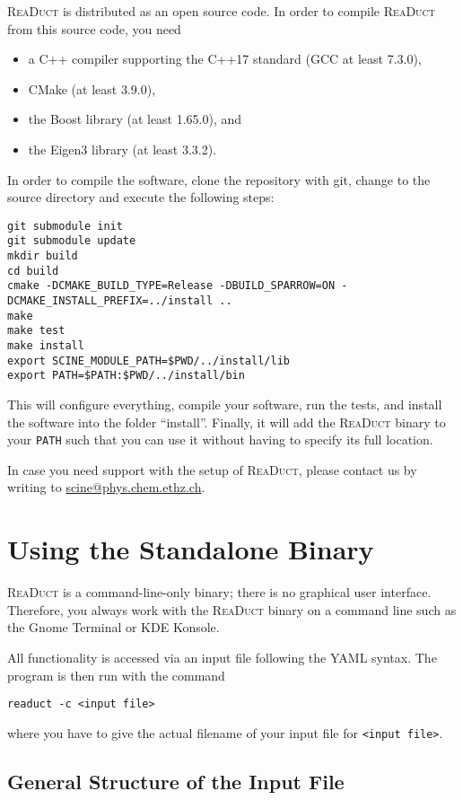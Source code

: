\documentclass[]{tufte-book}
\begin{document}
\textsc{ReaDuct} is distributed as an open source code. In order to compile \textsc{ReaDuct} from this source code, you need
\begin{itemize}
 \item a C++ compiler supporting the C++17 standard (GCC at least 7.3.0),
 \item CMake (at least 3.9.0),
 \item the Boost library (at least 1.65.0), and
 \item the Eigen3 library (at least 3.3.2).
\end{itemize}
In order to compile the software, clone the repository with git, change
to the source directory and execute the following steps:
\begin{verbatim}
git submodule init
git submodule update
mkdir build
cd build
cmake -DCMAKE_BUILD_TYPE=Release -DBUILD_SPARROW=ON -DCMAKE_INSTALL_PREFIX=../install ..
make
make test
make install
export SCINE_MODULE_PATH=$PWD/../install/lib
export PATH=$PATH:$PWD/../install/bin
\end{verbatim}
This will configure everything, compile your software, run the tests, and install the software
into the folder ``install''. Finally, it will add the \textsc{ReaDuct} binary to your \texttt{PATH} such that you can use
it without having to specify its full location.

In case you need support with the setup of \textsc{ReaDuct}, please contact us by writing to \href{scine@phys.chem.ethz.ch}{scine@phys.chem.ethz.ch}.



\chapter{Using the Standalone Binary}

\textsc{ReaDuct} is a command-line-only binary; there is no graphical user interface. Therefore, you always work with the
\textsc{ReaDuct} binary on a command line such as the Gnome Terminal or KDE Konsole.

All functionality is accessed via an input file following the YAML syntax. The program is then run with the
command

\begin{verbatim}
readuct -c <input file>
\end{verbatim}

where you have to give the actual filename of your input file for \texttt{<input file>}.


\section{General Structure of the Input File}
\end{document}
